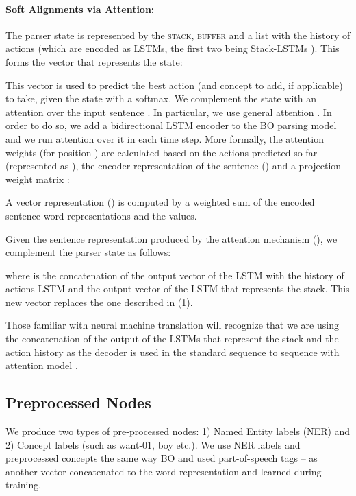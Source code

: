 \documentclass[11pt,a4paper]{article}
\begin{document}
\paragraph{Soft Alignments via Attention:}
\label{att}

The parser state is represented by the \textsc{stack}, \textsc{buffer}  and a list with the history of actions (which are encoded as LSTMs, the first two being Stack-LSTMs \cite{dyer15}). This forms the vector   that represents the state:





This vector  is used to predict the best action (and concept to add, if applicable) to take, given the state with a softmax. We complement the state with an attention over the input sentence \cite{bahdanau2014neural}. In particular, we use general attention \cite{DBLP:conf/emnlp/LuongPM15}. In order to do so, we add a bidirectional LSTM encoder to the BO parsing model and we run attention over it in each time step. More formally, the attention weights  (for position ) are calculated based on the actions predicted so far (represented as ), the encoder representation of the sentence () and a projection weight matrix :


A vector representation () is computed by a weighted sum of the encoded sentence word representations and the  values.


Given the sentence representation produced by the attention mechanism (), we complement the parser state as follows:

where  is the concatenation of the output vector of the LSTM with the history of actions LSTM and the output vector of the LSTM that represents the stack. This new vector  replaces the one described in (1).

Those familiar with neural machine translation will recognize that we are using the concatenation of the output of the LSTMs that represent the stack and the action history as the decoder is used in the standard sequence to sequence with attention model \cite{bahdanau2014neural}.

\subsection{Preprocessed Nodes}

We produce two types of pre-processed nodes: 1) Named Entity labels (NER) and 2) Concept labels (such as want-01, boy etc.). We use NER labels and preprocessed concepts the same way BO and  used part-of-speech tags -- as another vector concatenated to the word representation and learned during training.
\end{document}
